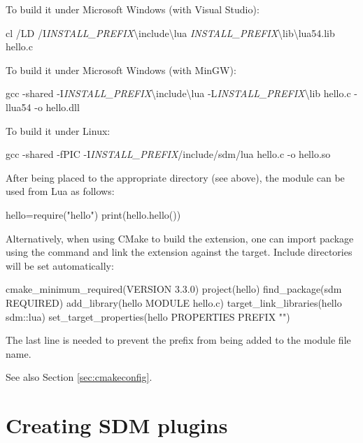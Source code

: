\documentclass[a4paper,12pt,twoside,extrafontsizes]{memoir}
\begin{document}
To build it under Microsoft Windows (with Visual Studio):

\begin{shellcmds}
cl /LD /I\emph{INSTALL\_PREFIX}\textbackslash{}include\textbackslash{}lua
    \emph{INSTALL\_PREFIX}\textbackslash{}lib\textbackslash{}lua54.lib hello.c
\end{shellcmds}

To build it under Microsoft Windows (with MinGW):

\begin{shellcmds}
gcc -shared -I\emph{INSTALL\_PREFIX}\textbackslash{}include\textbackslash{}lua
    -L\emph{INSTALL\_PREFIX}\textbackslash{}lib hello.c -llua54 -o hello.dll
\end{shellcmds}

To build it under Linux:

\begin{shellcmds}
gcc -shared -fPIC -I\emph{INSTALL\_PREFIX}/include/sdm/lua
    hello.c -o hello.so
\end{shellcmds}

After being placed to the appropriate directory (see above), the module can be used from Lua as follows:

\begin{shellcmds}\begin{luacode}
hello=require("hello")
print(hello.hello())
\end{luacode}\end{shellcmds}

Alternatively, when using CMake to build the extension, one can import  package using the  command and link the extension against the  target. Include directories will be set automatically:

\begin{shellcmds}
cmake\_minimum\_required(VERSION 3.3.0)
project(hello)
find\_package(sdm REQUIRED)
add\_library(hello MODULE hello.c)
target\_link\_libraries(hello sdm::lua)
set\_target\_properties(hello PROPERTIES PREFIX "")
\end{shellcmds}

The last line is needed to prevent the  prefix from being added to the module file name.

See also Section \ref{sec:cmakeconfig}.

\chapter{Creating SDM plugins}
\label{ch:sdk}
\end{document}
